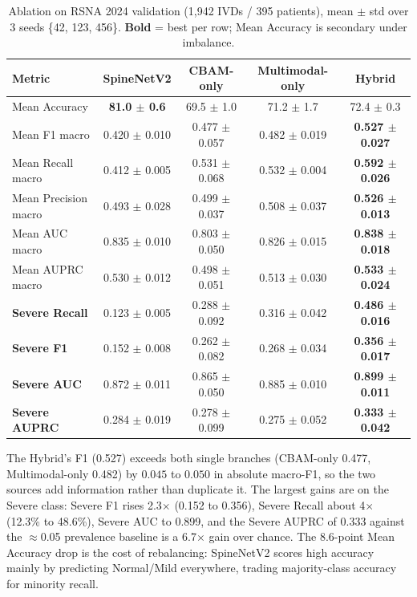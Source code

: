 \documentclass[runningheads]{llncs}
\newcommand{\best}[1]{\textbf{#1}}
\begin{document}
\begin{table}[htbp]
\centering
\caption{Ablation on RSNA 2024 validation (1{,}942 IVDs / 395 patients), mean $\pm$ std over 3 seeds \{42, 123, 456\}. \textbf{Bold} = best per row; Mean Accuracy is secondary under imbalance.}
\label{tab:main}
\footnotesize
\setlength{\tabcolsep}{1pt}
\begin{tabular}{@{}lcccc@{}}
\toprule
Metric & SpineNetV2 & CBAM-only & Multimodal-only & Hybrid \\
\midrule
Mean Accuracy        & \best{81.0 $\pm$ 0.6} & 69.5 $\pm$ 1.0 & 71.2 $\pm$ 1.7 & 72.4 $\pm$ 0.3 \\
Mean F1 macro        & 0.420 $\pm$ 0.010 & 0.477 $\pm$ 0.057 & 0.482 $\pm$ 0.019 & \best{0.527 $\pm$ 0.027} \\
Mean Recall macro    & 0.412 $\pm$ 0.005 & 0.531 $\pm$ 0.068 & 0.532 $\pm$ 0.004 & \best{0.592 $\pm$ 0.026} \\
Mean Precision macro & 0.493 $\pm$ 0.028 & 0.499 $\pm$ 0.037 & 0.508 $\pm$ 0.037 & \best{0.526 $\pm$ 0.013} \\
Mean AUC macro       & 0.835 $\pm$ 0.010 & 0.803 $\pm$ 0.050 & 0.826 $\pm$ 0.015 & \best{0.838 $\pm$ 0.018} \\
Mean AUPRC macro     & 0.530 $\pm$ 0.012 & 0.498 $\pm$ 0.051 & 0.513 $\pm$ 0.030 & \best{0.533 $\pm$ 0.024} \\
\midrule
\textbf{Severe Recall} & 0.123 $\pm$ 0.005 & 0.288 $\pm$ 0.092 & 0.316 $\pm$ 0.042 & \best{0.486 $\pm$ 0.016} \\
\textbf{Severe F1}    & 0.152 $\pm$ 0.008 & 0.262 $\pm$ 0.082 & 0.268 $\pm$ 0.034 & \best{0.356 $\pm$ 0.017} \\
\textbf{Severe AUC}   & 0.872 $\pm$ 0.011 & 0.865 $\pm$ 0.050 & 0.885 $\pm$ 0.010 & \best{0.899 $\pm$ 0.011} \\
\textbf{Severe AUPRC} & 0.284 $\pm$ 0.019 & 0.278 $\pm$ 0.099 & 0.275 $\pm$ 0.052 & \best{0.333 $\pm$ 0.042} \\
\bottomrule
\end{tabular}
\end{table}

The Hybrid's F1 (0.527) exceeds both single branches (CBAM-only 0.477, Multimodal-only 0.482) by $0.045$ to $0.050$ in absolute macro-F1, so the two sources add information rather than duplicate it. The largest gains are on the Severe class: Severe F1 rises 2.3$\times$ (0.152 to 0.356), Severe Recall about 4$\times$ (12.3\% to 48.6\%), Severe AUC to 0.899, and the Severe AUPRC of 0.333 against the $\approx$0.05 prevalence baseline is a 6.7$\times$ gain over chance. The 8.6-point Mean Accuracy drop is the cost of rebalancing: SpineNetV2 scores high accuracy mainly by predicting Normal/Mild everywhere, trading majority-class accuracy for minority recall.
\end{document}
